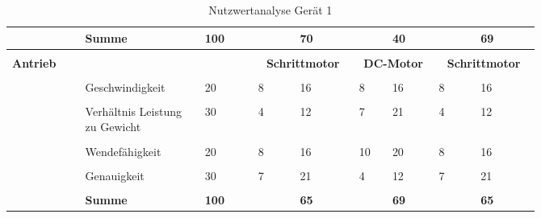 \documentclass[main.tex]{subfiles} %
\begin{document}
\begin{landscape}
\begin{table}[ht]
\begin{tabular}{|p{0.11\linewidth}|p{0.18\linewidth}|p{0.085\linewidth}|p{0.057\linewidth}|p{0.07\linewidth}|p{0.057\linewidth}|p{0.07\linewidth}|p{0.057\linewidth}|p{0.07\linewidth}|}
            & \textbf{Summe} & \textbf{100} &  & \textbf{70} &  & \textbf{40} &  & \textbf{69} \\[1pt]
            \hline
            \hline
            & \multicolumn{2}{c|}{} & \multicolumn{2}{c|}{} & \multicolumn{2}{c|}{} & \multicolumn{2}{c|}{} \\[-9pt]
            \multirow{6}{4em}{\textbf{Antrieb}} & \multicolumn{2}{c|}{} & \multicolumn{2}{c|}{\textbf{Schrittmotor}} & \multicolumn{2}{c|}{\textbf{DC-Motor}} & \multicolumn{2}{c|}{\textbf{Schrittmotor}} \\[1pt]
            \cline{2-9}
            &&&&&&&&\\[-9pt]
            & Geschwindigkeit & 20 & 8 & 16 & 8 & 16 & 8 & 16 \\[1pt]
            \cline{2-9}
            &&&&&&&&\\[-9pt]
            & Verhältnis Leistung zu Gewicht & 30 & 4 & 12 & 7 & 21 & 4 & 12 \\[1pt]
            \cline{2-9}
            &&&&&&&&\\[-9pt]
            & Wendefähigkeit & 20 & 8 & 16 & 10 & 20 & 8 & 16 \\[1pt]
            \cline{2-9}
            &&&&&&&&\\[-9pt]
            & Genauigkeit & 30 & 7 & 21 & 4 & 12 & 7 & 21 \\[1pt]
            \cline{2-9}
            &&&&&&&&\\[-9pt]
            & \textbf{Summe} & \textbf{100} &  & \textbf{65} &  & \textbf{69} &  & \textbf{65} \\[1pt]
            \hline

            \end{tabular}
        \caption{Nutzwertanalyse Gerät 1}
        \end{table}


\end{landscape}
\end{document}
